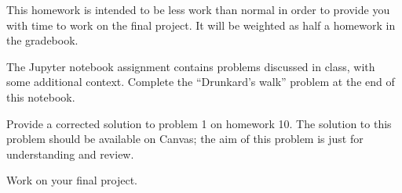 \documentclass[]{homework}
\begin{document}

This homework is intended to be less work than normal in order to provide you with
time to work on the final project.
It will be weighted as half a homework in the gradebook.

\begin{problem}{1}
  The Jupyter notebook assignment contains problems discussed in class, with some
  additional context.
  Complete the ``Drunkard's walk'' problem at the end of this notebook.
\end{problem}

\begin{problem}{2}
  Provide a corrected solution to problem 1 on homework 10.
  The solution to this problem should be available on Canvas;
  the aim of this problem is just for understanding and review.
\end{problem}

\begin{problem}{3}
  Work on your final project.
\end{problem}
\end{document}
